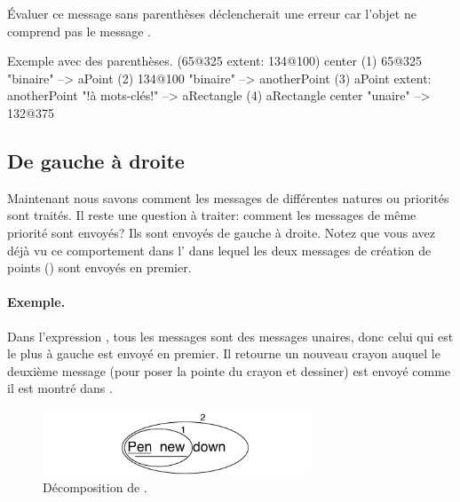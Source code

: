 \documentclass[a4paper,10pt,twoside]{book}
\begin{document}
Évaluer ce message sans parenthèses déclencherait une erreur car
l'objet  ne comprend pas le message .

\begin{example}[decExtent]{Exemple avec des parenthèses.}{}
      (65@325 extent: 134@100) center
(1)   65@325                                                    "binaire"
    --> aPoint
(2)                                134@100                     "binaire"
                                 --> anotherPoint
(3)   aPoint extent: anotherPoint                       "!à mots-clés!"
      --> aRectangle
(4)   aRectangle center                                     "unaire"
      --> 132@375
\end{example}

\subsection{De gauche à droite}
Maintenant nous savons comment les messages de différentes natures
ou priorités sont traités. Il reste une question à traiter:
comment les messages de même priorité sont envoyés? Ils sont
envoyés de gauche à droite. Notez que vous avez déjà vu ce
comportement dans l' dans lequel les deux messages de
création de points () sont envoyés en premier.



\paragraph{Exemple.} Dans l'expression , tous les
messages sont des messages unaires, donc celui qui est le plus à
gauche  est envoyé en premier. Il retourne un nouveau
crayon auquel le deuxième message  
(pour poser la pointe du crayon et dessiner)
est envoyé comme il est montré dans .

\begin{figure}
	\centering
	\includegraphics[width=8cm]{ucompoUn}
	\caption{Décomposition de .}
\end{figure}
\end{document}
